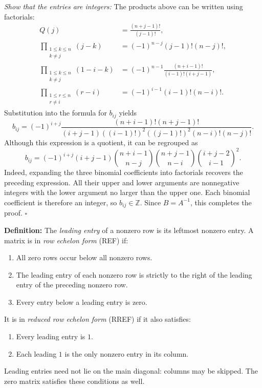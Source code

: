 \documentclass[a4paper,11pt,abstract=true]{scrartcl}
\theoremstyle{dotlessP}
\theoremstyle{dotlessS}
\theoremstyle{remark}
\theoremstyle{definition}
\begin{document}
\begin{claim_box}
\emph{Show that the entries are integers:} The products above
can be written using factorials:
\[
\begin{aligned}
Q(j)&=\frac{(n+j-1)!}{(j-1)!},\\
\prod_{\substack{1\leq k\leq n\\k\neq j}}(j-k)
&={(-1)}^{n-j}(j-1)!(n-j)!,\\
\prod_{\substack{1\leq k\leq n\\k\neq j}}(1-i-k)
&={(-1)}^{n-1}\frac{(n+i-1)!}{(i-1)!(i+j-1)},\\
\prod_{\substack{1\leq r\leq n\\r\neq i}}(r-i)
&={(-1)}^{i-1}(i-1)!(n-i)!.
\end{aligned}
\]
Substitution into the formula for $b_{ij}$ yields
\[
b_{ij}={(-1)}^{i+j}
\frac{(n+i-1)!(n+j-1)!}
{(i+j-1){((i-1)!)}^2{((j-1)!)}^2(n-i)!(n-j)!}.
\]
Although this expression is a quotient, it can be regrouped as
\[
\boxed{
b_{ij}={(-1)}^{i+j}(i+j-1)
\binom{n+i-1}{n-j}\binom{n+j-1}{n-i}
\binom{i+j-2}{i-1}^{\!2}.}
\]
Indeed, expanding the three binomial coefficients into factorials
recovers the preceding expression. All their upper and lower arguments
are nonnegative integers with the lower argument no larger than the
upper one. Each binomial coefficient is therefore an integer, so
$b_{ij}\in\mathbb{Z}$. Since $B=A^{-1}$, this completes the proof.
\hfill$\square$
\end{claim_box}

\begin{definition_box}
\textbf{Definition:} The
\emph{leading entry} of a nonzero row is its leftmost nonzero entry.
A matrix is in \emph{row echelon form} (REF) if:
\begin{enumerate}
    \item All zero rows occur below all nonzero rows.
    \item The leading entry of each nonzero row is strictly to the
    right of the leading entry of the preceding nonzero row.
    \item Every entry below a leading entry is zero.
\end{enumerate}
It is in \emph{reduced row echelon form} (RREF) if it also satisfies:
\begin{enumerate}
    \item Every leading entry is $1$.
    \item Each leading $1$ is the only nonzero entry in its column.
\end{enumerate}
Leading entries need not lie on the main diagonal: columns may be
skipped. The zero matrix satisfies these conditions as well.
\end{definition_box}
\end{document}
